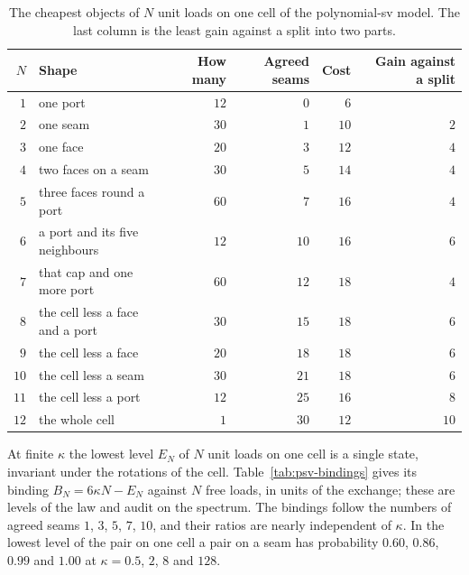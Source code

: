 \begin{table}[htbp]
\centering\small
\caption{The cheapest objects of $N$ unit loads on one cell of the polynomial-sv model.
The last column is the least gain against a split into two parts.}
\label{tab:psv-objects}
\begin{tabular}{@{}rlrrrr@{}}
\toprule
$N$ & Shape & How many & Agreed seams & Cost & Gain against a split\\
\midrule
$1$ & one port & $12$ & $0$ & $6$ & \\
$2$ & one seam & $30$ & $1$ & $10$ & $2$\\
$3$ & one face & $20$ & $3$ & $12$ & $4$\\
$4$ & two faces on a seam & $30$ & $5$ & $14$ & $4$\\
$5$ & three faces round a port & $60$ & $7$ & $16$ & $4$\\
$6$ & a port and its five neighbours & $12$ & $10$ & $16$ & $6$\\
$7$ & that cap and one more port & $60$ & $12$ & $18$ & $4$\\
$8$ & the cell less a face and a port & $30$ & $15$ & $18$ & $6$\\
$9$ & the cell less a face & $20$ & $18$ & $18$ & $6$\\
$10$ & the cell less a seam & $30$ & $21$ & $18$ & $6$\\
$11$ & the cell less a port & $12$ & $25$ & $16$ & $8$\\
$12$ & the whole cell & $1$ & $30$ & $12$ & $10$\\
\bottomrule
\end{tabular}
\end{table}

At finite $\kappa$ the lowest level $E_N$ of $N$ unit loads on one cell is a single state,
invariant under the rotations of the cell. Table~\ref{tab:psv-bindings} gives its binding
$B_N=6\kappa N-E_N$ against $N$ free loads, in units of the exchange; these are levels of
the law and audit on the spectrum. The bindings follow the numbers of agreed seams $1$,
$3$, $5$, $7$, $10$, and their ratios are nearly independent of $\kappa$. In the lowest
level of the pair on one cell a pair on a seam has probability $0.60$, $0.86$, $0.99$ and
$1.00$ at $\kappa=0.5$, $2$, $8$ and $128$.

